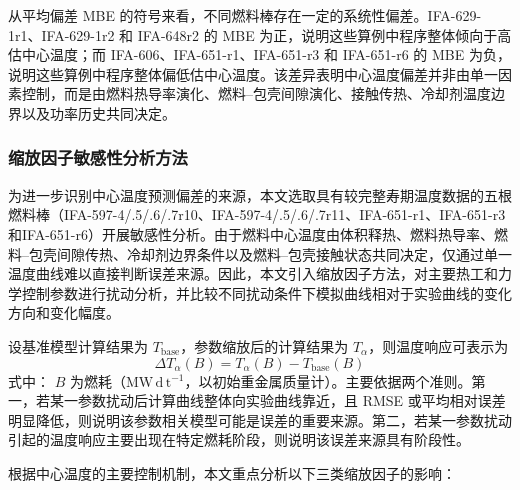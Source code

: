 从平均偏差 MBE 的符号来看，不同燃料棒存在一定的系统性偏差。IFA-629-1r1、IFA-629-1r2 和 IFA-648r2 的 MBE 为正，说明这些算例中程序整体倾向于高估中心温度；而 IFA-606、IFA-651-r1、IFA-651-r3 和 IFA-651-r6 的 MBE 为负，说明这些算例中程序整体偏低估中心温度。该差异表明中心温度偏差并非由单一因素控制，而是由燃料热导率演化、燃料--包壳间隙演化、接触传热、冷却剂温度边界以及功率历史共同决定。

\FloatBarrier
\subsubsection{缩放因子敏感性分析方法}
为进一步识别中心温度预测偏差的来源，本文选取具有较完整寿期温度数据的五根燃料棒（IFA-597-4/.5/.6/.7r10、IFA-597-4/.5/.6/.7r11、IFA-651-r1、IFA-651-r3和IFA-651-r6）开展敏感性分析。由于燃料中心温度由体积释热、燃料热导率、燃料--包壳间隙传热、冷却剂边界条件以及燃料--包壳接触状态共同决定，仅通过单一温度曲线难以直接判断误差来源。因此，本文引入缩放因子方法，对主要热工和力学控制参数进行扰动分析，并比较不同扰动条件下模拟曲线相对于实验曲线的变化方向和变化幅度。

设基准模型计算结果为 \(T_\mathrm{base}\)，参数缩放后的计算结果为 \(T_\alpha\)，则温度响应可表示为
\[
\Delta T_\alpha(B)
=
T_\alpha(B)-T_\mathrm{base}(B)
\]
\noindent 式中： \(B\) 为燃耗（$\mathrm{MW\,d\,t^{-1}}$，以初始重金属质量计）。主要依据两个准则。第一，若某一参数扰动后计算曲线整体向实验曲线靠近，且 RMSE 或平均相对误差明显降低，则说明该参数相关模型可能是误差的重要来源。第二，若某一参数扰动引起的温度响应主要出现在特定燃耗阶段，则说明该误差来源具有阶段性。

根据中心温度的主要控制机制，本文重点分析以下三类缩放因子的影响：

